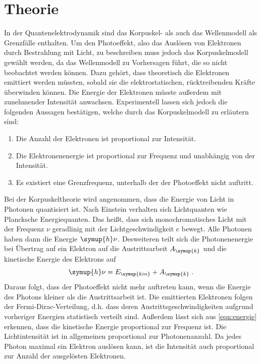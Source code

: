 \section{Theorie}
\label{sec:Theorie}

In der Quantenelektrodynamik sind das Korpuskel- als auch das Wellenmodell als Grenzfälle enthalten.
Um den Photoeffekt, also das Auslösen von Elektronen durch Bestrahlung mit Licht, zu beschreiben 
muss jedoch das Korpuskelmodell gewählt werden, da das Wellenmodell zu Vorhersagen führt, die so nicht 
beobachtet werden können. Dazu gehört, dass theoretisch die Elektronen emittiert werden müssten, sobald sie 
die elektrostatischen, rücktreibenden Kräfte überwinden können. Die Energie der Elektronen müsste außerdem 
mit zunehmender Intensität anwachsen. Experimentell lassen sich jedoch die folgenden Aussagen bestätigen, 
welche durch das Korpuskelmodell zu erläutern sind: 
 \begin{enumerate}
    \item Die Anzahl der Elektronen ist proportional zur Intensität.
    \item Die Elektronenenergie ist proportional zur Frequenz und unabhängig von der Intensität.
    \item Es existiert eine Grenzfrequenz, unterhalb der der Photoeffekt nicht auftritt. 
 \end{enumerate}

 Bei der Korpuskeltheorie wird angenommen, dass die Energie von Licht in Photonen quantisiert ist.
 Nach Einstein verhalten sich Lichtquanten wie Plancksche Energiequanten. Das heißt, dass sich 
 monochromatisches Licht mit der Frequenz $\nu$ geradlinig mit der Lichtgeschwindigkeit c bewegt. 
 Alle Photonen haben dann die Energie $\symup{h}\nu$. Desweiteren teilt sich die Photonenenergie bei 
 Übertrag auf ein Elektron auf die Austrittsarbeit $A_{\symup{k}}$ und die kinetische Energie des 
 Elektrons auf
\begin{equation}
    \symup{h} \nu = E_{\symup{kin}} + A_{\symup{k}} \; .
    \label{eqn:energie}
\end{equation}
Daraus folgt, dass der Photoeffekt nicht mehr auftreten kann, wenn die Energie des Photons 
kleiner als die Austrittsarbeit ist. Die emittierten Elektronen folgen der Fermi-Dirac-Verteilung, d.h. 
dass deren Austrittsgeschwindigkeiten aufgrund vorheriger Energien statistisch verteilt sind.
 Außerdem lässt sich aus \autoref{eqn:energie} erkennen, 
dass die kinetische Energie proportional zur Frequenz ist. Die Lichtintensität ist in allgemeinen 
proportional zur Photonenanzahl. Da jedes Photon maximal ein Elektron auslösen kann, ist die Intensität 
auch proportional zur Anzahl der ausgelösten Elektronen.

